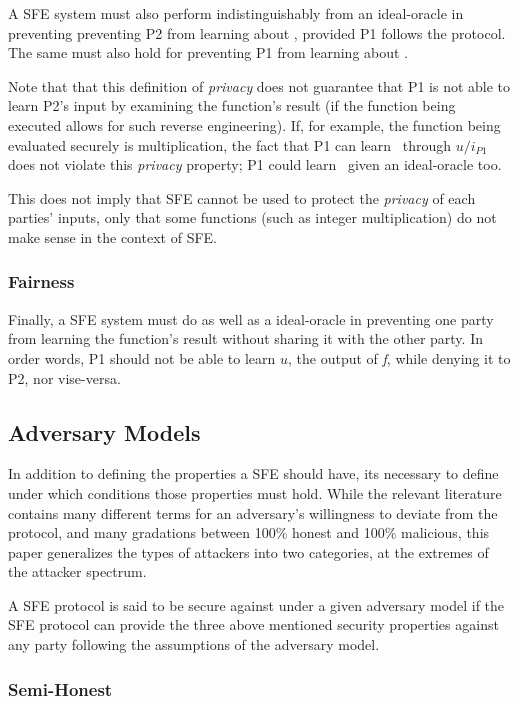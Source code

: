 A \ac{SFE} system must also perform indistinguishably from an ideal-oracle in preventing preventing \ac{P2} from learning about \ponein, provided \ac{P1} follows the protocol.  The same must also hold for preventing \ac{P1} from learning about \ptwoin.

Note that that this definition of \emph{privacy} does not guarantee that \ac{P1} is not able to learn \ac{P2}'s input by examining the function's result (if the function being executed allows for such reverse engineering).  If, for example, the function being evaluated securely is multiplication, the fact that \ac{P1} can learn \ptwoin\ through $u/i_{P1}$ does not violate this \emph{privacy} property; \ac{P1} could learn \ptwoin\ given an ideal-oracle too.

This does not imply that \ac{SFE} cannot be used to protect the \emph{privacy} of each parties' inputs, only that some functions (such as integer multiplication) do not make sense in the context of \ac{SFE}.

\subsubsection{Fairness}

Finally, a \ac{SFE} system must do as well as a ideal-oracle in preventing one party  from learning the function's result without sharing it with the other party. In order words, \ac{P1} should not be able to learn $u$, the output of \emph{f}, while denying it to \ac{P2}, nor vise-versa.

\subsection{Adversary Models}

In addition to defining the properties a \ac{SFE} should have, its necessary to define under which conditions those properties must hold.  While the relevant literature contains many different terms for an adversary's willingness to deviate from the protocol, and many gradations between 100\% honest and 100\% malicious, this paper generalizes the types of attackers into two categories, at the extremes of the attacker spectrum.

A \ac{SFE} protocol is said to be secure against under a given adversary model if the \ac{SFE} protocol can provide the three above mentioned security properties against any party following the assumptions of the adversary model.

\subsubsection{Semi-Honest}

